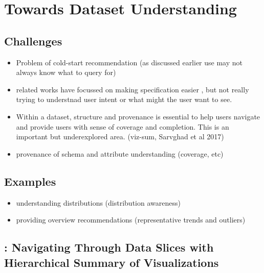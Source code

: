\section{Towards Dataset Understanding\label{sec:understanding}}
\subsection{Challenges}
\begin{itemize}
\item Problem of cold-start recommendation (as discussed earlier use may not always know what to query for)
\item related works have focussed on making specification easier , but not really trying to understnad user intent or what might the user want to see.
\item Within a dataset, structure and provenance is essential to help users navigate and provide users with sense of coverage and completion. This is an important but underexplored area. (viz-sum, Sarvghad et al 2017)
\item provenance of schema and attribute understanding (coverage, etc) 
\end{itemize}

\subsection{Examples}
\begin{itemize}
	\item understanding distributions (distribution awareness)
	\item providing overview recommendations (representative trends and outliers)
\end{itemize}

\subsection{\sbd: Navigating Through Data Slices with Hierarchical Summary of Visualizations}

